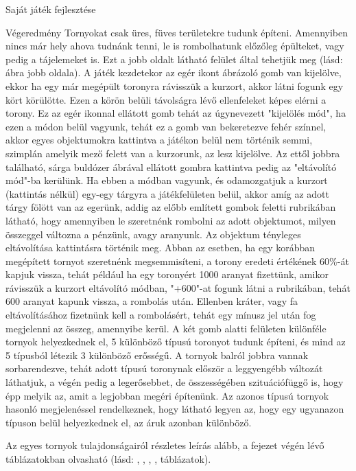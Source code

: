 \begin{MyChapter}{Saját játék fejlesztése}
\begin{MySection}{Végeredmény}
		Tornyokat csak üres, füves területekre tudunk építeni. Amennyiben nincs már hely ahova tudnánk tenni, le is rombolhatunk előzőleg épülteket, vagy pedig a tájelemeket is. Ezt a jobb oldalt látható felület által tehetjük meg (lásd:  ábra jobb oldala).		
		A játék kezdetekor az egér ikont ábrázoló gomb van kijelölve, ekkor ha egy már megépült toronyra rávisszük a kurzort, akkor látni fogunk egy kört körülötte. Ezen a körön belüli távolságra lévő ellenfeleket képes elérni a torony. Ez az egér ikonnal ellátott gomb tehát az úgynevezett "kijelölés mód", ha ezen a módon belül vagyunk, tehát ez a gomb van bekeretezve fehér színnel, akkor egyes objektumokra kattintva a játékon belül nem történik semmi, szimplán amelyik mező felett van a kurzorunk, az lesz kijelölve.
		Az ettől jobbra található, sárga buldózer ábrával ellátott gombra kattintva pedig az "eltávolító mód"-ba kerülünk. Ha ebben a módban vagyunk, és odamozgatjuk a kurzort (kattintás nélkül) egy-egy tárgyra a játékfelületen belül, akkor amíg az adott tárgy fölött van az egerünk, addig az előbb említett gombok feletti rubrikában látható, hogy amennyiben le szeretnénk rombolni az adott objektumot, milyen összeggel változna a pénzünk, avagy aranyunk. Az objektum tényleges eltávolítása kattintásra történik meg.
		Abban az esetben, ha egy korábban megépített tornyot szeretnénk megsemmisíteni, a torony eredeti értékének 60\%-át kapjuk vissza, tehát például ha egy toronyért 1000 aranyat fizettünk, amikor rávisszük a kurzort eltávolító módban, "+600"-at fogunk látni a rubrikában, tehát 600 aranyat kapunk vissza, a rombolás után. Ellenben kráter, vagy fa eltávolításához fizetnünk kell a rombolásért, tehát egy mínusz jel után fog megjelenni az összeg, amennyibe kerül.
		A két gomb alatti felületen különféle tornyok helyezkednek el, 5 különböző típusú toronyot tudunk építeni, és mind az 5 típusból létezik 3 különböző erősségű.
		A tornyok balról jobbra vannak sorbarendezve, tehát adott típusú toronynak először a leggyengébb változát láthatjuk, a végén pedig a legerősebbet, de összességében szituációfüggő is, hogy épp melyik az, amit a legjobban megéri építenünk. Az azonos típusú tornyok hasonló megjelenéssel rendelkeznek, hogy látható legyen az, hogy egy ugyanazon típuson belül helyezkednek el, az áruk azonban különböző.
		
		Az egyes tornyok tulajdonságairól részletes leírás alább, a fejezet végén lévő táblázatokban olvasható (lásd: , , , ,  táblázatok).
		

\end{MySection}
\end{MyChapter}
